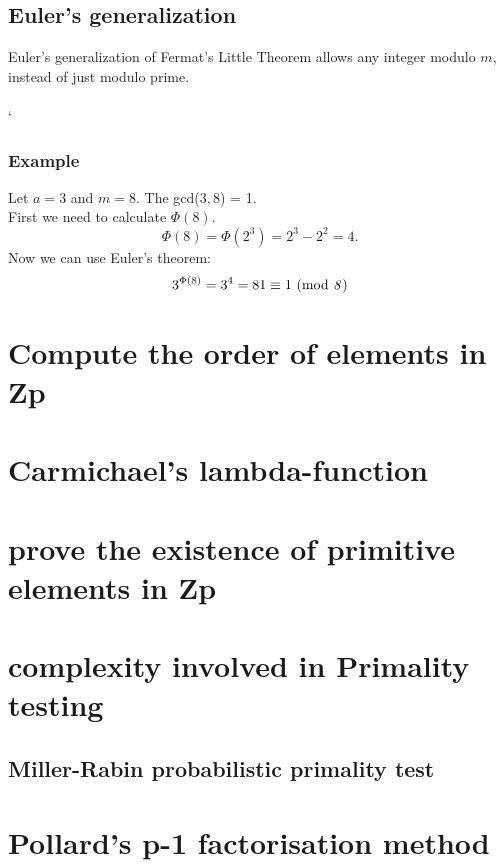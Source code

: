 \documentclass{article}
\begin{document}
 	\subsection*{Euler's generalization \cite{fermatsummary}}
 	Euler's generalization of Fermat's Little Theorem allows any integer modulo $m$, instead of just modulo prime.
 	\\
 	\\`
 	
 	\subsubsection*{Example}
 	Let $a = 3$ and $m = 8$. The gcd($3, 8$) = 1. 
 	\\
 	First we need to calculate $\Phi(8)$.
 	$$
 	\Phi(8) = \Phi(2^3) = 2^3-2^2 = 4.
 	$$
 	Now we can use Euler's theorem:
 	$$
 	3^{\Phi(8)} = 3^4 = 81 \equiv 1 \text{ (mod \textit{8})}
 	$$
 	
	\section*{Compute the order of elements in Zp} 
	
	\section*{Carmichael's lambda-function} 
	
	\section*{prove the existence of primitive elements in Zp}
	
	\section*{complexity involved in Primality testing}
	
	\subsection*{Miller-Rabin probabilistic primality test}
	
	\section*{Pollard's p-1 factorisation method}
	 
\end{document}
